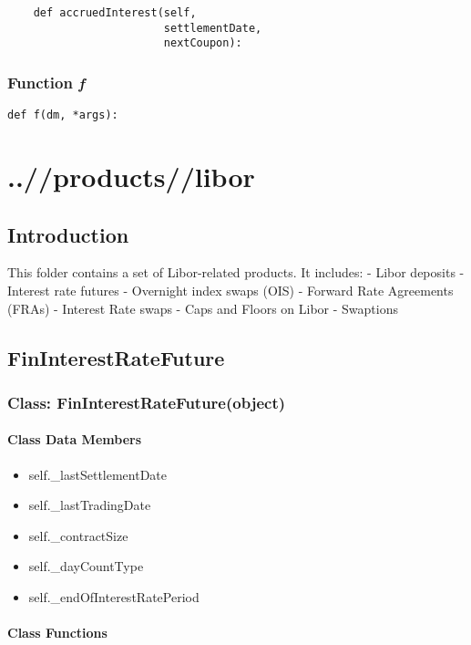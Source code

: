\documentclass[twoside,11pt]{book}
\begin{document}
\begin{lstlisting}
    def accruedInterest(self,
                        settlementDate,
                        nextCoupon):
\end{lstlisting}

\subsection{Function {\it f}}


\begin{lstlisting}
def f(dm, *args):
\end{lstlisting}


\chapter{..//products//libor}
\section{Introduction}
This folder contains a set of Libor-related products. It includes:
- Libor deposits
- Interest rate futures
- Overnight index swaps (OIS)
- Forward Rate Agreements (FRAs)
- Interest Rate swaps
- Caps and Floors on Libor
- Swaptions

\newpage
\section{FinInterestRateFuture}

\subsection{Class: FinInterestRateFuture(object)}


\subsubsection{Class Data Members}
\begin{itemize}
\item{self.\_lastSettlementDate}
\item{self.\_lastTradingDate}
\item{self.\_contractSize}
\item{self.\_dayCountType}
\item{self.\_endOfInterestRatePeriod}
\end{itemize}

\subsubsection{Class Functions}
\end{document}
